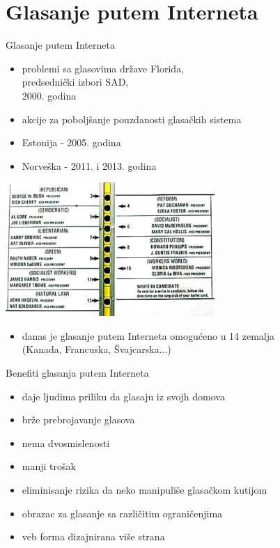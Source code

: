 \section{Glasanje putem Interneta}

\begin{frame}{Glasanje putem Interneta}
        \begin{minipage}{0.6\textwidth}
            \begin{itemize}
                \item problemi sa glasovima države Florida, 
                \\predsednički izbori SAD, \\2000. godina
                \item akcije za poboljšanje pouzdanosti glasačkih sistema
                \item Estonija - 2005. godina
                \item Norveška - 2011. i 2013. godina
            \end{itemize}
        \end{minipage}
        \begin{minipage}{0.3\linewidth}
            \centering
            
            \includegraphics[scale = 1]{images/election.jpg}
        \end{minipage}
        
        \begin{itemize}
            \item danas je glasanje putem Interneta omogućeno u 14 zemalja \\(Kanada, Francuska, Švajcarska...)
        \end{itemize}
    \end{frame}
    
    
    \begin{frame}{Benefiti glasanja putem Interneta}
    		\begin{itemize}
    			\item daje ljudima priliku da glasaju iz svojh domova
			\item brže prebrojavanje glasova
			\item nema dvosmislenosti
			\item manji trošak
            \item eliminisanje rizika da neko manipuliše glasačkom kutijom
            \item obrazac za glasanje sa različitim ograničenjima
			\item veb forma dizajnirana više strana 
    		\end{itemize}
    \end{frame}
    
